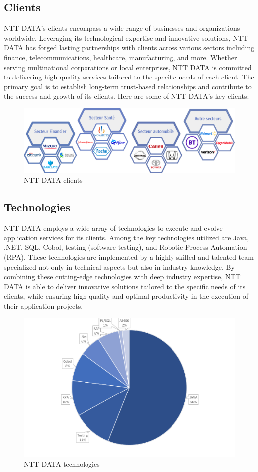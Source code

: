 \documentclass[12pt,a4paper,table,english]{article}
\begin{document}
	\pagebreak
	\subsection{Clients}
	
	NTT DATA's clients encompass a wide range of businesses and organizations worldwide. Leveraging its technological expertise and innovative solutions, NTT DATA has forged lasting partnerships with clients across various sectors including finance, telecommunications, healthcare, manufacturing, and more. Whether serving multinational corporations or local enterprises, NTT DATA is committed to delivering high-quality services tailored to the specific needs of each client. The primary goal is to establish long-term trust-based relationships and contribute to the success and growth of its clients. Here are some of NTT DATA's key clients:
	
	
	\begin{figure}[h!]
		\centering
		\includegraphics[width=0.8\linewidth]{Image/nttclients.png}
		\caption{NTT DATA clients}
		\label{fig:NTT DATA clients}
	\end{figure}
	
	
	\subsection{Technologies}
	
	
	NTT DATA employs a wide array of technologies to execute and evolve application services for its clients. Among the key technologies utilized are Java, .NET, SQL, Cobol, testing (software testing), and Robotic Process Automation (RPA). These technologies are implemented by a highly skilled and talented team specialized not only in technical aspects but also in industry knowledge. By combining these cutting-edge technologies with deep industry expertise, NTT DATA is able to deliver innovative solutions tailored to the specific needs of its clients, while ensuring high quality and optimal productivity in the execution of their application projects.
	
	\begin{figure}[h!]
		\centering
		\includegraphics[width=0.65\linewidth]{Image/ntttechnologies.png}
		\caption{NTT DATA technologies}
		\label{fig:NTT DATA technologies}
	\end{figure}
	
\end{document}

